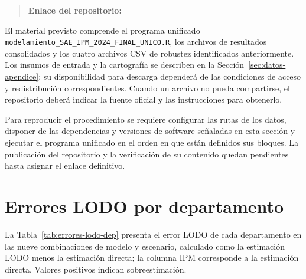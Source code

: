 \begin{quote}
\noindent\textbf{Enlace del repositorio:} \texttt{}
\end{quote}


El material previsto comprende el programa unificado
\texttt{modelamiento\_SAE\_IPM\_2024\_\allowbreak FINAL\_UNICO.R}, los archivos de resultados consolidados y los cuatro archivos CSV de robustez identificados anteriormente. Los insumos de entrada y la cartografía se describen en la Sección~\ref{sec:datos-apendice}; su disponibilidad para descarga dependerá de las condiciones de acceso y redistribución correspondientes. Cuando un archivo no pueda compartirse, el repositorio deberá indicar la fuente oficial y las instrucciones para obtenerlo.

Para reproducir el procedimiento se requiere configurar las rutas de los datos, disponer de las dependencias y versiones de software señaladas en esta sección y ejecutar el programa unificado en el orden en que están definidos sus bloques. La publicación del repositorio y la verificación de su contenido quedan pendientes hasta asignar el enlace definitivo.

\section{Errores LODO por departamento}
\label{sec:apendice-errores}

La Tabla~\ref{tab:errores-lodo-dep} presenta el error LODO de cada departamento en las nueve combinaciones de modelo y escenario, calculado como la estimación LODO menos la estimación directa; la columna IPM corresponde a la estimación directa. Valores positivos indican sobreestimación.

